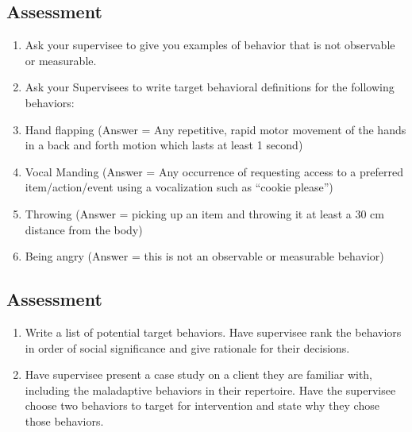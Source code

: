 \subsection{Assessment}
\begin{enumerate}
\item Ask your supervisee to give you examples of behavior that is not observable or measurable.
\item Ask your Supervisees to write target behavioral definitions for the following behaviors:
\item Hand flapping (Answer = Any repetitive, rapid motor movement of the hands in a back and forth motion which lasts at least 1 second) 
\item Vocal Manding (Answer = Any occurrence of requesting access to a preferred item/action/event using a vocalization such as ``cookie please'')
\item Throwing (Answer = picking up an item and throwing it at least a 30 cm distance from the body) 
\item Being angry (Answer = this is not an observable or measurable behavior)
%
\end{enumerate}
%
\subsection{Assessment}
\begin{enumerate}
\item Write a list of potential target behaviors. Have supervisee rank the behaviors in order of social significance and give rationale for their decisions.
\item Have supervisee present a case study on a client they are familiar with, including the maladaptive behaviors in their repertoire. Have the supervisee choose two behaviors to target for intervention and state why they chose those behaviors.
\end{enumerate}
%
